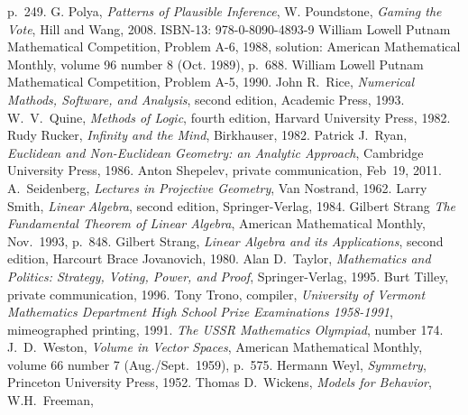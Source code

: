 \begin{thebibliography}{\makebox[2em][c]{{}\hfil{}}}
  p.~249.
  G. Polya,
  \emph{Patterns of Plausible Inference},
  W. Poundstone,
  \emph{Gaming the Vote},
  Hill and Wang, 2008.
  ISBN-13: 978-0-8090-4893-9 
  William Lowell Putnam Mathematical Competition,
  Problem A-6, 1988,
  solution: American Mathematical Monthly, 
  volume 96 number 8 (Oct. 1989),
  p.~688.
  William Lowell Putnam Mathematical Competition,
  Problem A-5, 1990.
  John R.\ Rice,
  \emph{Numerical Mathods, Software, and Analysis},
  second edition,
  Academic Press,
  1993.
  W.\ V.\ Quine,
  \emph{Methods of Logic},
  fourth edition,
  Harvard University Press,
  1982.
  Rudy Rucker,
  \emph{Infinity and the Mind},
  Birkhauser,
  1982.
  Patrick J.~Ryan,
  \emph{Euclidean and Non-Euclidean Geometry: an Analytic Approach},
  Cambridge University Press, 1986.
  Anton Shepelev,
  private communication,
  Feb~19, 2011.
  A.~Seidenberg,
  \emph{Lectures in Projective Geometry},
  Van Nostrand, 1962.
  Larry Smith,
  \emph{Linear Algebra},
  second edition,
  Springer-Verlag,
  1984.
  Gilbert Strang
  \emph{The Fundamental Theorem of Linear Algebra},
  American Mathematical Monthly,
  Nov.~1993, p.~848.
  Gilbert Strang,
  \emph{Linear Algebra and its Applications},
  second edition,
  Harcourt Brace Jovanovich,
  1980.
  Alan D.~Taylor,
  \emph{Mathematics and Politics: Strategy, Voting, Power, and Proof},
  Springer-Verlag,
  1995.
  Burt Tilley,
  private communication,
  1996.
  Tony Trono, compiler,
  \emph{University of Vermont Mathematics Department High School Prize
    Examinations 1958-1991},
  mimeographed printing, 1991.
  \emph{The USSR Mathematics Olympiad},
   number 174.
  J.~D.\ Weston,
  \emph{Volume in Vector Spaces},
  American Mathematical Monthly,
  volume 66 number 7 (Aug./Sept.\ 1959),
  p.~575.
  Hermann Weyl,
  \emph{Symmetry},
  Princeton University Press,
  1952.
  Thomas D.~Wickens,
  \emph{Models for Behavior},
  W.H.~Freeman,

\end{thebibliography}
